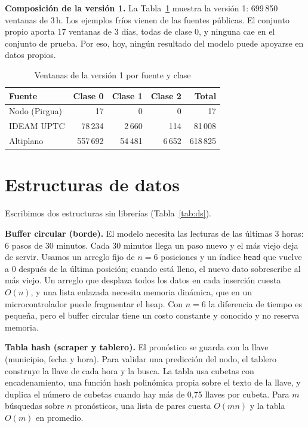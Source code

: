 \documentclass[conference]{IEEEtran}
\begin{document}
\textbf{Composici\'on de la versi\'on 1.} La Tabla~\ref{tab:v1} muestra la versi\'on 1: 699\,850 ventanas de 3\,h. Los ejemplos fr\'ios vienen de las fuentes p\'ublicas. El conjunto propio aporta 17 ventanas de 3 d\'ias, todas de clase 0, y ninguna cae en el conjunto de prueba. Por eso, hoy, ning\'un resultado del modelo puede apoyarse en datos propios.

\begin{table}[t]
\caption{Ventanas de la versi\'on 1 por fuente y clase}
\label{tab:v1}
\centering
\begin{tabular}{@{}lrrrr@{}}
\toprule
Fuente & Clase 0 & Clase 1 & Clase 2 & Total \\
\midrule
Nodo (Pirgua) & 17 & 0 & 0 & 17 \\
IDEAM UPTC & 78\,234 & 2\,660 & 114 & 81\,008 \\
Altiplano & 557\,692 & 54\,481 & 6\,652 & 618\,825 \\
\bottomrule
\end{tabular}
\end{table}

\section{Estructuras de datos}
Escribimos dos estructuras sin librer\'ias (Tabla~\ref{tab:ds}).

\textbf{Buffer circular (borde).} El modelo necesita las lecturas de las \'ultimas 3 horas: 6 pasos de 30 minutos. Cada 30 minutos llega un paso nuevo y el m\'as viejo deja de servir. Usamos un arreglo fijo de $n=6$ posiciones y un \'indice \texttt{head} que vuelve a 0 despu\'es de la \'ultima posici\'on; cuando est\'a lleno, el nuevo dato sobrescribe al m\'as viejo. Un arreglo que desplaza todos los datos en cada inserci\'on cuesta $O(n)$, y una lista enlazada necesita memoria din\'amica, que en un microcontrolador puede fragmentar el heap. Con $n=6$ la diferencia de tiempo es peque\~na, pero el buffer circular tiene un costo constante y conocido y no reserva memoria.

\textbf{Tabla hash (scraper y tablero).} El pron\'ostico se guarda con la llave (municipio, fecha y hora). Para validar una predicci\'on del nodo, el tablero construye la llave de cada hora y la busca. La tabla usa cubetas con encadenamiento, una funci\'on hash polin\'omica propia sobre el texto de la llave, y duplica el n\'umero de cubetas cuando hay m\'as de 0,75 llaves por cubeta. Para $m$ b\'usquedas sobre $n$ pron\'osticos, una lista de pares cuesta $O(mn)$ y la tabla $O(m)$ en promedio.
\end{document}
